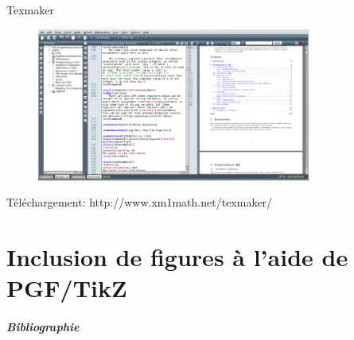 \documentclass{beamer}
\begin{document}

\begin{frame}{Texmaker}

\begin{figure} %
\centering %
\includegraphics[width=9cm]{img/TexmakerView} %
\end{figure} %

{\footnotesize Téléchargement: http://www.xm1math.net/texmaker/ }

\end{frame}



\part{Inclusion de figures à l'aide de PGF/TikZ}






\begin{frame}
  \frametitle{Bibliographie}

\nocite{*}


\end{frame}


\end{document}
